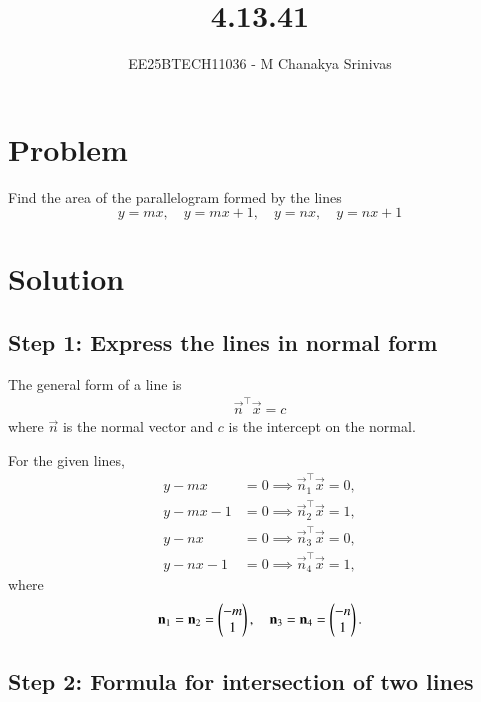 \documentclass[journal]{IEEEtran}
\begin{document}

\vspace{3cm}

\title{4.13.41}
\author{EE25BTECH11036 - M Chanakya Srinivas}
\maketitle

\renewcommand{\thetable}{\theenumi}
\setlength{\intextsep}{10pt}
\renewcommand\theequation{\arabic{equation}}




\section*{Problem}
Find the area of the parallelogram formed by the lines
\[
y = mx, \quad y = mx + 1, \quad y = nx, \quad y = nx + 1
\]

\section*{Solution}

\subsection*{Step 1: Express the lines in normal form}

The general form of a line is
\begin{align}
\vec{n}^\top\vec{x} = c
\end{align}
where \(\vec{n}\) is the normal vector and \(c\) is the intercept on the normal.

For the given lines,
\begin{align}
y - mx &= 0 \implies \vec{n}_1^\top\vec{x} = 0,\\
y - mx - 1 &= 0 \implies \vec{n}_2^\top\vec{x} = 1,\\
y - nx &= 0 \implies \vec{n}_3^\top\vec{x} = 0,\\
y - nx - 1 &= 0 \implies \vec{n}_4^\top\vec{x} = 1,
\end{align}
where
\begin{align}
\mathbf{n}_1 = \mathbf{n}_2 = \begin{pmatrix}-m \\ 1\end{pmatrix}, \quad
\mathbf{n}_3 = \mathbf{n}_4 = \begin{pmatrix}-n \\ 1\end{pmatrix}.
\end{align}

\subsection*{Step 2: Formula for intersection of two lines}
\end{document}
